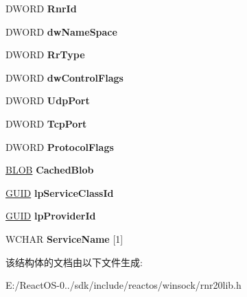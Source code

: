 \begin{DoxyCompactItemize}
D\+W\+O\+RD {\bfseries Rnr\+Id}
\item 
\mbox{\label{struct___r_n_r___c_o_n_t_e_x_t_ad2146e004259883d906f8a29f705fc88}} 
D\+W\+O\+RD {\bfseries dw\+Name\+Space}
\item 
\mbox{\label{struct___r_n_r___c_o_n_t_e_x_t_a7c5ccfd0bfcb0d557a4640954633d695}} 
D\+W\+O\+RD {\bfseries Rr\+Type}
\item 
\mbox{\label{struct___r_n_r___c_o_n_t_e_x_t_ae80c965775af24def90c83a6e383fff5}} 
D\+W\+O\+RD {\bfseries dw\+Control\+Flags}
\item 
\mbox{\label{struct___r_n_r___c_o_n_t_e_x_t_a25ce411e95bd6f943d98be580f9fefe7}} 
D\+W\+O\+RD {\bfseries Udp\+Port}
\item 
\mbox{\label{struct___r_n_r___c_o_n_t_e_x_t_a7de2bfcd9af6af408db8c817c66a8c71}} 
D\+W\+O\+RD {\bfseries Tcp\+Port}
\item 
\mbox{\label{struct___r_n_r___c_o_n_t_e_x_t_ad2910d782084cd267aa132c98022e54d}} 
D\+W\+O\+RD {\bfseries Protocol\+Flags}
\item 
\mbox{\label{struct___r_n_r___c_o_n_t_e_x_t_ac4002d6dddb4d8744f3d7345c2977291}} 
\hyperlink{struct___b_l_o_b}{B\+L\+OB} {\bfseries Cached\+Blob}
\item 
\mbox{\label{struct___r_n_r___c_o_n_t_e_x_t_af2288cc4ff39ad5d1ff48f9848ae0094}} 
\hyperlink{interface_g_u_i_d}{G\+U\+ID} {\bfseries lp\+Service\+Class\+Id}
\item 
\mbox{\label{struct___r_n_r___c_o_n_t_e_x_t_a7a5f54977f1d44d92c3aa1982a816ef7}} 
\hyperlink{interface_g_u_i_d}{G\+U\+ID} {\bfseries lp\+Provider\+Id}
\item 
\mbox{\label{struct___r_n_r___c_o_n_t_e_x_t_a08ea477d8a7b4f90baed5f4e40c549de}} 
W\+C\+H\+AR {\bfseries Service\+Name} \mbox{[}1\mbox{]}
\end{DoxyCompactItemize}


该结构体的文档由以下文件生成\+:\begin{DoxyCompactItemize}
\item 
E\+:/\+React\+O\+S-\/0../sdk/include/reactos/winsock/rnr20lib.\+h\end{DoxyCompactItemize}
